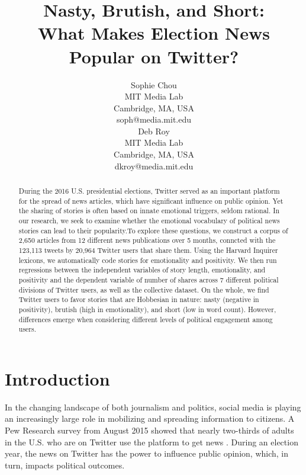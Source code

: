 \documentclass[letterpaper]{article}
\begin{document}
%
\title{Nasty, Brutish, and Short:\\
What Makes Election News Popular on Twitter?}
\author{Sophie Chou\\
MIT Media Lab\\
Cambridge, MA, USA\\
soph@media.mit.edu\\
\And
Deb Roy\\
MIT Media Lab\\
Cambridge, MA, USA\\
dkroy@media.mit.edu\\
}
\maketitle
\begin{abstract}
During the 2016 U.S. presidential elections, Twitter served as an important platform for the spread of news articles, which have significant influence on public opinion. Yet the sharing of stories is often based on innate emotional triggers, seldom rational. In our research, we seek to examine whether the emotional vocabulary of political news stories can lead to their popularity.To explore these questions, we construct a corpus of 2,650 articles from 12 different news publications over 5 months, conncted with the 123,113 tweets by 20,964 Twitter users that share them. Using the Harvard Inquirer lexicons, we automatically code stories for emotionality and positivity. We then run regressions between the independent variables of story length, emotionality, and positivity and the dependent variable of number of shares across 7 different political divisions of Twitter users, as well as the collective dataset. On the whole, we find Twitter users to favor stories that are Hobbesian in nature: nasty (negative in positivity), brutish (high in emotionality), and short (low in word count). However, differences emerge when considering different levels of political engagement among users.
\end{abstract}

 
\section{Introduction}
In the changing landscape of both journalism and politics, social media is playing an increasingly large role in mobilizing and spreading information to citizens. A Pew Research survey from August 2015 showed that nearly two-thirds of adults in the U.S. who are on Twitter use the platform to get news \cite{pew-Twitter-news}. During an election year, the news on Twitter has the power to influence public opinion, which, in turn, impacts political outcomes.
\end{document}
